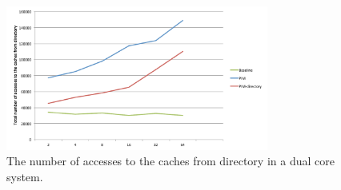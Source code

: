 \begin{figure}[h]
  \centering
  \includegraphics[height = 2.5 in, width=3.4in]{figures/figure9.pdf}
  \caption{The number of accesses to the caches from directory in a dual core system.}
  \label{fig:profile}
\end{figure}
